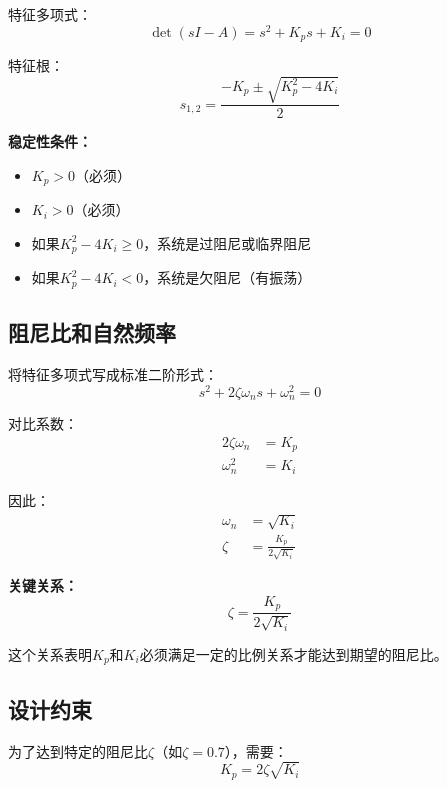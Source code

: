 \documentclass[12pt,a4paper]{article}
\begin{document}
特征多项式：
\begin{equation}
\det(sI - A) = s^2 + K_p s + K_i = 0
\end{equation}

特征根：
\begin{equation}
s_{1,2} = \frac{-K_p \pm \sqrt{K_p^2 - 4K_i}}{2}
\end{equation}

\textbf{稳定性条件：}
\begin{itemize}
\item $K_p > 0$（必须）
\item $K_i > 0$（必须）
\item 如果$K_p^2 - 4K_i \geq 0$，系统是过阻尼或临界阻尼
\item 如果$K_p^2 - 4K_i < 0$，系统是欠阻尼（有振荡）
\end{itemize}

\subsection{阻尼比和自然频率}

将特征多项式写成标准二阶形式：
\begin{equation}
s^2 + 2\zeta\omega_n s + \omega_n^2 = 0
\end{equation}

对比系数：
\begin{align}
2\zeta\omega_n &= K_p \\
\omega_n^2 &= K_i
\end{align}

因此：
\begin{align}
\omega_n &= \sqrt{K_i} \\
\zeta &= \frac{K_p}{2\sqrt{K_i}}
\end{align}

\textbf{关键关系：}
\begin{equation}
\zeta = \frac{K_p}{2\sqrt{K_i}}
\end{equation}

这个关系表明$K_p$和$K_i$必须满足一定的比例关系才能达到期望的阻尼比。

\subsection{设计约束}

为了达到特定的阻尼比$\zeta$（如$\zeta = 0.7$），需要：
\begin{equation}
K_p = 2\zeta\sqrt{K_i}
\end{equation}
\end{document}
